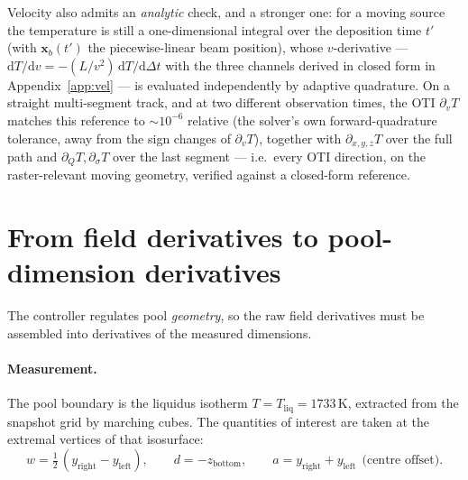 \documentclass[11pt]{article}
\newcommand{\dd}{\mathrm{d}}
\begin{document}
Velocity also admits an \emph{analytic} check, and a stronger one: for a moving
source the temperature is still a one-dimensional integral over the deposition
time $t'$ (with $\mathbf{x}_{b}(t')$ the piecewise-linear beam position), whose
$v$-derivative --- $\dd T/\dd v = -(L/v^2)\,\dd T/\dd\Delta t$ with the three
channels derived in closed form in Appendix~\ref{app:vel} --- is evaluated
independently by adaptive quadrature. On a
straight multi-segment track, and at two different observation times, the OTI
$\partial_v T$ matches this reference to $\sim\!10^{-6}$ relative (the solver's
own forward-quadrature tolerance, away from the sign changes of $\partial_v T$),
together with $\partial_{x,y,z}T$ over the full path and $\partial_Q T,
\partial_\sigma T$ over the last segment --- i.e.\ every OTI direction, on the
raster-relevant moving geometry, verified against a closed-form reference.

\section{From field derivatives to pool-dimension derivatives}
\label{sec:ift}

The controller regulates pool \emph{geometry}, so the raw field derivatives
must be assembled into derivatives of the measured dimensions.

\paragraph{Measurement.} The pool boundary is the liquidus isotherm
$T = T_{\mathrm{liq}} = 1733$\,K, extracted from the snapshot grid by
marching cubes. The quantities of interest are taken at the extremal vertices
of that isosurface:
\[
  w = \tfrac12\,(y_{\mathrm{right}} - y_{\mathrm{left}}),
  \qquad
  d = -z_{\mathrm{bottom}},
  \qquad
  a = y_{\mathrm{right}} + y_{\mathrm{left}} \ \ \text{(centre offset)} .
\]
\end{document}
